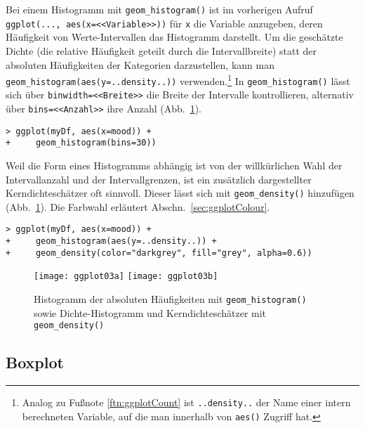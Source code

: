 Bei einem Histogramm mit \lstinline!geom_histogram()! ist im vorherigen Aufruf \lstinline!ggplot(..., aes(x=<<Variable>>))! für \lstinline!x! die Variable anzugeben, deren Häufigkeit von Werte-Intervallen das Histogramm darstellt. Um die geschätzte Dichte (die relative Häufigkeit geteilt durch die Intervallbreite) statt der absoluten Häufigkeiten der Kategorien darzustellen, kann man \lstinline!geom_histogram(aes(y=..density..))! verwenden.\footnote{Analog zu Fußnote \ref{ftn:ggplotCount} ist \lstinline!..density..! der Name einer intern berechneten Variable, auf die man innerhalb von \lstinline!aes()! Zugriff hat.} In \lstinline!geom_histogram()! lässt sich über \lstinline!binwidth=<<Breite>>! die Breite der Intervalle kontrollieren, alternativ über \lstinline!bins=<<Anzahl>>! ihre Anzahl (Abb.\ \ref{fig:ggplot03}).
\begin{lstlisting}
> ggplot(myDf, aes(x=mood)) +
+     geom_histogram(bins=30))
\end{lstlisting}

Weil die Form eines Histogramms abhängig ist von der willkürlichen Wahl der Intervallanzahl und der Intervallgrenzen, ist ein zusätzlich dargestellter Kerndichteschätzer oft sinnvoll. Dieser lässt sich mit \lstinline!geom_density()! hinzufügen (Abb.\ \ref{fig:ggplot03}). Die Farbwahl erläutert Abschn.\ \ref{sec:ggplotColour}.
\begin{lstlisting}
> ggplot(myDf, aes(x=mood)) +
+     geom_histogram(aes(y=..density..)) +
+     geom_density(color="darkgrey", fill="grey", alpha=0.6))
\end{lstlisting}

\begin{figure}[ht]
\centering
\texttt{[image: ggplot03a]}
\texttt{[image: ggplot03b]}
\vspace*{-0.5em}
\caption{Histogramm der absoluten Häufigkeiten mit \lstinline!geom_histogram()! sowie Dichte-Histogramm und Kerndichteschätzer mit \lstinline!geom_density()!}
\label{fig:ggplot03}
\end{figure}

\subsection{Boxplot}
\label{sec:ggplotBoxplot}

